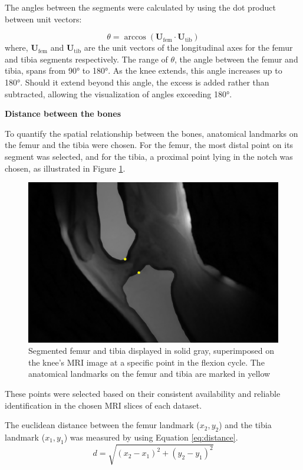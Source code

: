 \documentclass{micro-econ-thesis}
\begin{document}
The angles between the segments were calculated by using the dot product between unit vectors:

\begin{equation}
	\theta = \arccos(\mathbf{U}_{\text{fem}} \cdot \mathbf{U}_{\text{tib}})
	\label{eq:angle}
\end{equation}
where, $\mathbf{U}_{\text{fem}}$ and $\mathbf{U}_{\text{tib}}$ are the unit vectors of the longitudinal axes for the femur and tibia segments respectively. The range of $\theta$, the angle between the femur and tibia, spans from 90° to 180°. As the knee extends, this angle increases up to 180°. Should it extend beyond this angle, the excess is added rather than subtracted, allowing the visualization of angles exceeding 180°. 

\textbf{Distance between the bones}

To quantify the spatial relationship between the bones, anatomical landmarks on the femur and the tibia were chosen. For the femur, the most distal point on its segment was selected, and for the tibia, a  proximal point lying in the notch was chosen, as illustrated in Figure \ref{fig:twopoints}.   
\begin{figure}[H]
	\centering
	\includegraphics[width=0.7\linewidth]{two_points}
	\caption{Segmented femur and tibia displayed in solid gray, superimposed on the knee's MRI image at a specific point in the flexion cycle. The anatomical landmarks on the femur and tibia are marked in yellow}
	\label{fig:twopoints}
\end{figure}

These points were selected based on their consistent availability and reliable identification in the chosen MRI slices of each dataset.

The euclidean distance between the femur landmark ($x_2, y_2$) and the tibia landmark ($x_1, y_1$) was measured by using Equation \ref{eq:distance}. 
\begin{equation}
	d = \sqrt{(x_2 - x_1)^2 + (y_2 - y_1)^2}
	\label{eq:distance}
\end{equation} 
\end{document}
